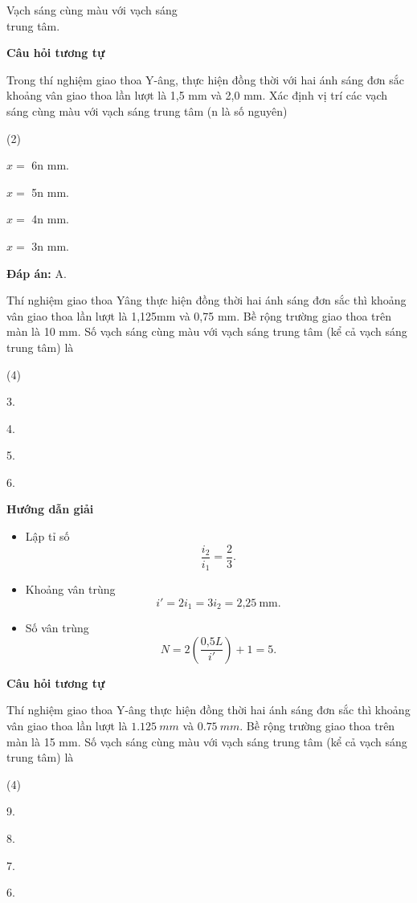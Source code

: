 \begin{dang}{Vạch sáng cùng màu với vạch sáng\\ trung tâm.}
{\begin{center}
	\textbf{Câu hỏi tương tự}
\end{center}

Trong thí nghiệm giao thoa Y-âng, thực hiện đồng thời với hai ánh sáng đơn sắc khoảng vân giao thoa lần lượt là 1,5 mm và 2,0 mm. Xác định vị trí các vạch sáng cùng màu với vạch sáng trung tâm (n là số nguyên)
\begin{mcq}(2)
\item $x =$ 6n mm. 	
\item $x =$ 5n mm.   	  
\item $x =$ 4n mm.          
\item $x =$ 3n mm. 
\end{mcq}

\textbf{Đáp án:} A.
}
{Thí nghiệm giao thoa Yâng thực hiện đồng thời hai ánh sáng đơn sắc thì khoảng vân giao thoa lần lượt là 1,125mm và 0,75 mm. Bề rộng trường giao thoa trên màn là 10 mm. Số vạch sáng cùng màu với vạch sáng trung tâm (kể cả vạch sáng trung tâm) là
\begin{mcq}(4)
\item 3.			
\item 4.				
\item 5.				
\item 6.
\end{mcq}
}
{\begin{center}
	\textbf{Hướng dẫn giải}
\end{center}

\begin{itemize}
	\item Lập tỉ số
	\begin{equation*}
		\dfrac{i_2}{i_1}=\dfrac{2}{3}.
	\end{equation*}
	\item Khoảng vân trùng
	\begin{equation*}
		i'=2i_1=3i_2= \text{2,25}\ \text{mm}.
	\end{equation*}
	\item Số vân trùng
	\begin{equation*}
	N=2\left(\dfrac{\text{0,5} L}{i'}\right) +1=5.
	\end{equation*}
\end{itemize}

\begin{center}
	\textbf{Câu hỏi tương tự}
\end{center}

Thí nghiệm giao thoa Y-âng thực hiện đồng thời hai ánh sáng đơn sắc thì khoảng vân giao thoa lần lượt là $ \SI{1,125}{mm} $ và $ \SI{0,75}{mm} $. Bề rộng trường giao thoa trên màn là 15 mm. Số vạch sáng cùng màu với vạch sáng trung tâm (kể cả vạch sáng trung tâm) là
\begin{mcq}(4)
\item 9.			
\item 8.				
\item 7.				
\item 6.
\end{mcq}

}
\end{dang}
